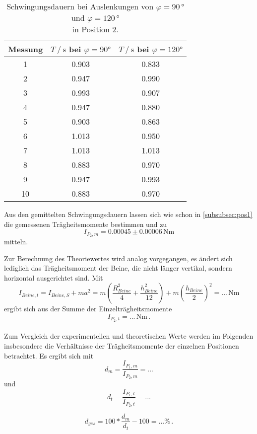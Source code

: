 \begin{table}[H]
  \centering
  \begin{tabular}{S[table-format=2.0] S[table-format=1.3] S}
      \toprule
      {Messung} & {$T \mathbin{/} \unit{\second}$ bei $\varphi = 90 \unit{\degree}$} & {$T \mathbin{/} \unit{\second}$ bei $\varphi = 120 \unit{\degree}$}\\
        & 0.903 & 0.833 \\
      2  & 0.947 & 0.990 \\
      3  & 0.993 & 0.907 \\
      4  & 0.947 & 0.880 \\
      5  & 0.903 & 0.863 \\
      6  & 1.013 & 0.950 \\
      7  & 1.013 & 1.013 \\
      8  & 0.883 & 0.970 \\
      9  & 0.947 & 0.993 \\
      10 & 0.883 & 0.970 \\
      \bottomrule
  \end{tabular}
  \caption{Schwingungsdauern bei Auslenkungen von $\varphi = 90 \, \unit{\degree}$ und $\varphi = 120 \, \unit{\degree}$ \\ in Position 2.}
  \label{tab:Messung_g}
\end{table}

Aus den gemittelten Schwingungsdauern lassen sich wie schon in \autoref{subsubsec:pos1} die gemessenen Trägheitsmomente bestimmen und zu
\begin{equation*}
  I_{P_2,m} = 0.00045 \pm 0.00006 \, \unit{\newton\meter}
\end{equation*}
mitteln.

Zur Berechnung des Theoriewertes wird analog vorgegangen, es ändert sich lediglich das Trägheitsmoment der Beine, die nicht länger vertikal, sondern horizontal ausgerichtet sind.
Mit 
\begin{equation*}
  I_{Beine,t} = I_{Beine,S} + m a^2 = m \left(\frac{R^2_{Beine}}{4} + \frac{h^2_{Beine}}{12} \right) + m \left(\frac{h_{Beine}}{2} \right)^2 = ... \, \unit{\newton\meter}
\end{equation*}
ergibt sich aus der Summe der Einzelträgheitsmomente
\begin{equation*}
  I_{P_2,t} = ... \, \unit{\newton\meter} \,.
\end{equation*} \\

Zum Vergleich der experimentellen und theoretischen Werte werden im Folgenden insbesondere die Verhältnisse der Trägheitsmomente der einzelnen Positionen betrachtet. %
Es ergibt sich mit
\begin{equation*}
  d_m= \frac{I_{P_1,m}}{I_{P_2,m}} = ... 
\end{equation*}
und
\begin{equation*}
  d_t = \frac{I_{P_1,t}}{I_{P_2,t}} = ...
\end{equation*}

\begin{equation*}
  d_{ges} = 100 * \frac{d_m}{d_t} - 100 = ... \% \,.
\end{equation*}
